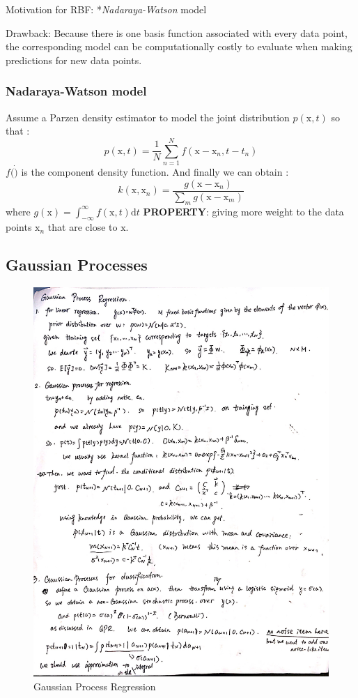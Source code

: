 \documentclass[a4paper]{book}
\begin{document}
Motivation for RBF:   *\emph{Nadaraya-Watson} model

Drawback: Because there is one basis function associated with every data point, the corresponding model can be computationally costly to evaluate when making predictions for new data points.
\subsubsection{ Nadaraya-Watson model}
Assume a Parzen density estimator to model the joint distribution $p(\mathrm x, t) $ so that :
\begin{equation}
p(\mathrm x,t) = \frac1N\sum_{n=1}^{N}f(\mathrm x-\mathrm x_n,t-t_n)
\end{equation}
$f(\dot)$ is the component density function. And finally we can obtain :
\begin{equation}
k(\mathrm x,\mathrm x_n) = \frac{g(\mathrm x-\mathrm x_n)}{\sum_mg(\mathrm x-\mathrm x_m)}  
\end{equation}
where $g(\mathrm x) = \int_{-\infty}^{\infty}f(\mathrm x,t)\mathrm dt$
\textbf{PROPERTY}:  giving more weight to the data points $\mathrm x_n$ that are close to $\mathrm x$.
\subsection{Gaussian Processes}
\begin{figure}
  \centering
  \includegraphics[width=\textwidth]{./imgs/GPR.jpg}
  \caption{Gaussian Process Regression}\label{fig3.5.1}
\end{figure}
\end{document}
